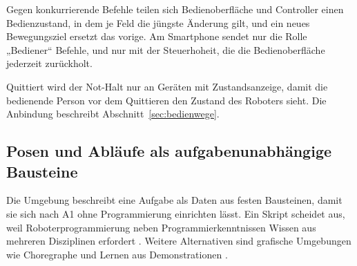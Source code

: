 
Gegen konkurrierende Befehle teilen sich Bedienoberfläche und Controller einen Bedienzustand, in dem je Feld die jüngste Änderung gilt, und ein neues Bewegungsziel ersetzt das vorige.
Am Smartphone sendet nur die Rolle „Bediener“ Befehle, und nur mit der Steuerhoheit, die die Bedienoberfläche jederzeit zurückholt.

Quittiert wird der Not-Halt nur an Geräten mit Zustandsanzeige, damit die bedienende Person vor dem Quittieren den Zustand des Roboters sieht.
Die Anbindung beschreibt Abschnitt~\ref{sec:bedienwege}.

\subsection{Posen und Abläufe als aufgabenunabhängige Bausteine}
\label{sec:posen_ablaeufe}
Die Umgebung beschreibt eine Aufgabe als Daten aus festen Bausteinen, damit sie sich nach A1 ohne Programmierung einrichten lässt.
Ein Skript scheidet aus, weil Roboterprogrammierung neben Programmierkenntnissen Wissen aus mehreren Disziplinen erfordert \cite{Ajaykumar2021}.
Weitere Alternativen sind grafische Umgebungen wie Choregraphe \cite{Pot2009} und Lernen aus Demonstrationen \cite{Cheng2024}.

